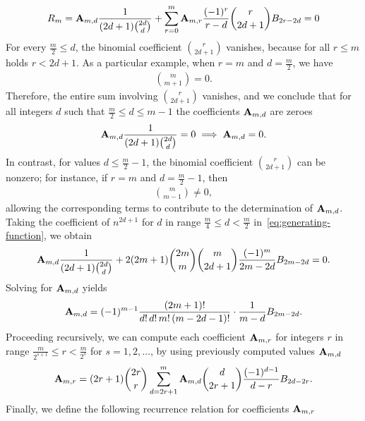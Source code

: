 \begin{align*}
[n^{2d+1}]
    R_m = \coeffA{m}{d} \frac{1}{(2d+1) \binom{2d}{d}} + \sum_{r=0}^m \coeffA{m}{r} \frac{(-1)^r}{r-d} \binom{r}{2d+1} \bernoulli{2r-2d} = 0
\end{align*}
For every $\frac{m}{2} \leq d$, the binomial coefficient $\binom{r}{2d+1}$ vanishes, because for all $r \leq m$
holds $r < 2d+1$.
As a particular example, when $r = m$ and $d = \frac{m}{2}$, we have
\begin{align*}
    \binom{m}{m+1} = 0.
\end{align*}
Therefore, the entire sum involving $\binom{r}{2d+1}$ vanishes, and we conclude
that for all integers $d$ such that $\frac{m}{2} \leq d \leq m-1$ the coefficients ${\mathbf{A}} \sb{m,d}$
are zeroes
\begin{align*}
    {\mathbf{A}} \sb{m,d} \frac{1}{(2d+1) \binom{2d}{d}} = 0 \implies {\mathbf{A}} \sb{m,d} = 0.
\end{align*}
In contrast, for values $d \leq \frac{m}{2} - 1$, the binomial coefficient $\binom{r}{2d+1}$ can be nonzero; for instance, if $r = m$ and $d = \frac{m}{2} - 1$, then
\begin{align*}
    \binom{m}{m - 1} \neq 0,
\end{align*}
allowing the corresponding terms to contribute to the determination of ${\mathbf{A}} \sb{m,d}$.
Taking the coefficient of $n^{2d+1}$ for $d$ in range $\frac{m}{4} \leq d < \frac{m}{2}$ in~\eqref{eq:generating-function}, we obtain
\begin{align*}
    {\mathbf{A}} \sb{m,d} \frac{1}{(2d+1) \binom{2d}{d}}
    + 2 (2m+1) \binom{2m}{m} \binom{m}{2d+1} \frac{(-1)^m}{2m - 2d} {B}\sb{2m - 2d} = 0.
\end{align*}
Solving for ${\mathbf{A}} \sb{m,d}$ yields
\begin{equation*}
    {\mathbf{A}} \sb{m,d}
    = (-1)^{m-1} \frac{(2m+1)!}{d! \, d! \, m! \, (m - 2d - 1)!} \cdot \frac{1}{m - d} {B}\sb{2m - 2d}.
\end{equation*}
Proceeding recursively, we can compute each coefficient ${\mathbf{A}} \sb{m,r}$ for integers $r$ in range
$\frac{m}{2^{s+1}} \leq r < \frac{m}{2^s}$ for $s = 1, 2, \ldots$,
by using previously computed values ${\mathbf{A}} \sb{m,d}$
\begin{equation*}
    {\mathbf{A}} \sb{m,r} =
    (2r+1) \binom{2r}{r} \sum_{d = 2r+1}^{m}
    {\mathbf{A}} \sb{m,d} \binom{d}{2r+1} \frac{(-1)^{d-1}}{d - r} {B}\sb{2d - 2r}.
\end{equation*}
Finally, we define the following recurrence relation for coefficients ${\mathbf{A}} \sb{m,r}$
